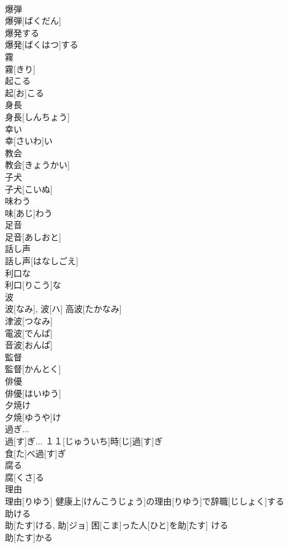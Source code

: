 \documentclass[8pt]{extreport}
\begin{document}
\begin{CJK}{UTF8}{min}
\\	爆弾	
\\	爆弾[ばくだん]	
\\	爆発する	
\\	爆発[ばくはつ]する	
\\	霧	
\\	霧[きり]	
\\	起こる	
\\	起[お]こる	
\\	身長	
\\	身長[しんちょう]	
\\	幸い	
\\	幸[さいわ]い	
\\	教会	
\\	教会[きょうかい]	
\\	子犬	
\\	子犬[こいぬ]	
\\	味わう	
\\	味[あじ]わう	
\\	足音	
\\	足音[あしおと]	
\\	話し声	
\\	話し声[はなしごえ]	
\\	利口な	
\\	利口[りこう]な	
\\	波	
\\	波[なみ], 波[ハ]	高波[たかなみ] 
\\	津波[つなみ] 
\\	電波[でんぱ] 
\\	音波[おんぱ] 
\\	監督	
\\	監督[かんとく]	
\\	俳優	
\\	俳優[はいゆう]	
\\	夕焼け	
\\	夕焼[ゆうや]け	
\\	過ぎ...	
\\	過[す]ぎ...	１１[じゅういち]時[じ]過[す]ぎ　
\\	食[た]べ過[す]ぎ　
\\	腐る	
\\	腐[くさ]る	
\\	理由	
\\	理由[りゆう]	健康上[けんこうじょう]の理由[りゆう]で辞職[じしょく]する 
\\	助ける	
\\	助[たす]ける, 助[ジョ]	困[こま]った人[ひと]を助[たす] ける 
\\	助[たす]かる 

\end{CJK}
\end{document}
